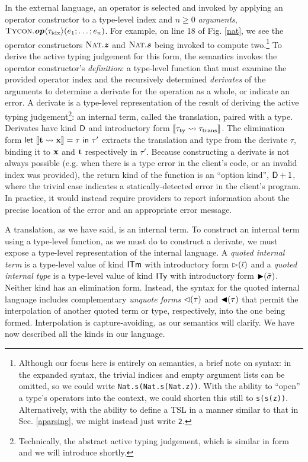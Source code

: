 In the external language, an operator is selected and invoked by applying an operator constructor to a type-level index and $n \geq 0$ \emph{arguments}, $\eop{Tycon}{op}{\tauidx}{\splat{e}{1}{n}}$. For example, on line 18 of Fig. \ref{nat}, we see the operator constructors $\fvar{Nat}.\opvar{z}$ and $\fvar{Nat}.\opvar{s}$ being invoked to compute two.\footnote{Although our focus here is entirely on semantics, a brief note on syntax: in the expanded syntax, the trivial indices and empty argument lists can be omitted, so we could write \texttt{Nat.s(Nat.s(Nat.z))}. With the ability to ``open'' a type's operators into the context, we could shorten this still to \texttt{s(s(z))}. Alternatively, with the ability to define a TSL in a manner similar to that in Sec. \ref{aparsing}, we might instead just write \texttt{2}.}
To derive the active typing judgement for this form, the semantics invokes  
 the operator constructor's  \emph{definition}: a type-level function that must examine the provided operator index and the recursively determined \emph{derivates} of the arguments to determine a derivate for the operation as a whole,  or indicate an error. A derivate is a type-level representation of the result of deriving the active typing judgement\footnote{Technically, the abstract active typing judgement, which is similar in form and we will introduce shortly.}: an internal term, called the {translation},  paired with a type. Derivates have kind $\kDen$ and introductory form $\tden{\tautrans}{\tautype}$. The elimination form $\tderbind{x}{t}{\tau}{\tau'}$ extracts the translation and type from the derivate $\tau$, binding it to $\tvar{x}$ and $\tvar{t}$ respectively in $\tau'$. 
Because constructing a derivate is not always possible (e.g. when there is a type error in the client's code, or an invalid index was provided), the return kind of the function is an ``option kind'', $\ksum{\kDen}{\kunit}$, where the trivial case indicates a statically-detected error in the client's program. In practice, it would instead require providers to report information about the precise location of the error and an appropriate error message.
 
A translation, as we have said, is an internal term. To construct an internal term using a type-level function, as we must do to construct a derivate, we must expose a type-level representation of the internal language. A \emph{quoted internal term} is a type-level value of kind $\kITerm$ with introductory form $\titerm{\bar \iota}$ and a \emph{quoted internal type} is a type-level value of kind $\kIType$ with introductory form $\titype{\bar \sigma}$. Neither kind has an elimination form. Instead, the syntax for the quoted  internal language includes complementary \emph{unquote forms} $\iup{\tau}$ and $\dup{\tau}$ that permit the interpolation of another quoted term or type, respectively, into the one being formed. Interpolation is capture-avoiding, as our semantics will clarify. We have now described all the kinds in our language.

